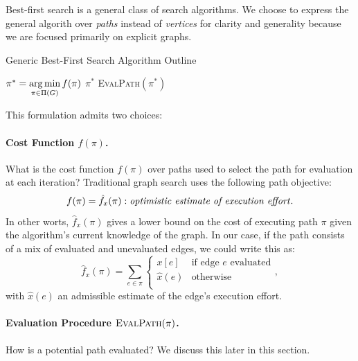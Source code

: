 Best-first search\cite{winston1977ai}
is a general class of search algorithms.
We choose to express the general algorith
over \emph{paths} instead of \emph{vertices}
for clarity and generality
because we are focused primarily on explicit graphs.
\begin{algorithm}
   \caption{Generic Best-First Search Algorithm Outline}
   \label{alg:generic-best-first}
   \begin{algorithmic}[1]
   \Loop
      \State $\pi^* = \operatorname*{arg\,min}\limits_{\pi \in \Pi(G)} f(\pi)$
         \label{line:generic-select-optimistic-path}
         \State \Return $\pi^*$
      \EndIf
      \State \textsc{EvalPath}$(\pi^*)$
   \EndLoop
   \EndProcedure
   \end{algorithmic}
\end{algorithm}

\noindent
This formulation admits two choices:

\paragraph{Cost Function $f(\pi)$.}
What is the cost function $f(\pi)$ over paths used to select the
path for evaluation at each iteration?
Traditional graph search uses the following path objective:
\begin{equation}
   f(\pi) = \hat{f}_x(\pi): \mbox{\emph{optimistic estimate of execution effort}}.
\end{equation}
In other worts, $\hat{f}_x(\pi)$
gives a lower bound on the cost of executing
path $\pi$
given the algorithm's current knowledge of the graph.
In our case,
if the path consists of a mix of evaluated and unevaluated edges,
we could write this as:
\begin{equation}
   \hat{f}_x(\pi) = \sum_{e \in \pi} \left\{
   \begin{array}{cl}
      x[e] & \mbox{if edge } e \mbox{ evaluated}  \\
      \hat{x}(e) & \mbox{otherwise} \\
   \end{array}
   \right.
   ,
   \label{eqn:execution-cost-objective}
\end{equation}
with $\hat{x}(e)$ an admissible estimate of the edge's execution effort.

\paragraph{Evaluation Procedure $\mbox{\sc EvalPath}(\pi)$.}
How is a potential path evaluated?
We discuss this later in this section.

